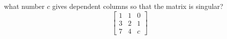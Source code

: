\documentclass[addpoints]{exam}
\begin{document}
\begin{questions}
	 
	 \question what number $c$ gives dependent columns so that the matrix is singular?
	 \begin{equation*}
	  \begin{bmatrix} 1 & 1 & 0 \\ 3 & 2 & 1\\ 7 & 4 & c \end{bmatrix} 
	 \end{equation*}
	 
 \end{questions}
\end{document}
